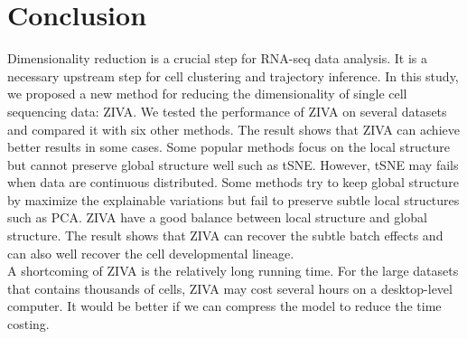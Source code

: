 \section{Conclusion}
Dimensionality reduction is a crucial step for RNA-seq data analysis. It is a necessary upstream step for cell clustering and trajectory inference. In this study, we proposed a new method for reducing the dimensionality of single cell sequencing data: ZIVA. We tested the performance of ZIVA on several datasets and compared it with six other methods. The result shows that ZIVA can achieve better results in some cases. Some popular methods focus on the local structure but cannot preserve global structure well such as tSNE. However, tSNE may fails when data are continuous distributed. Some methods try to keep global structure by maximize the explainable variations but fail to preserve subtle local structures such as PCA. ZIVA have a good balance between local structure and global structure. The result shows that ZIVA can recover the subtle batch effects and can also well recover the cell developmental lineage.\\
A shortcoming of ZIVA is the relatively long running time. For the large datasets that contains thousands of cells, ZIVA may cost several hours on a desktop-level computer. It would be better if we can compress the model to reduce the time costing.
